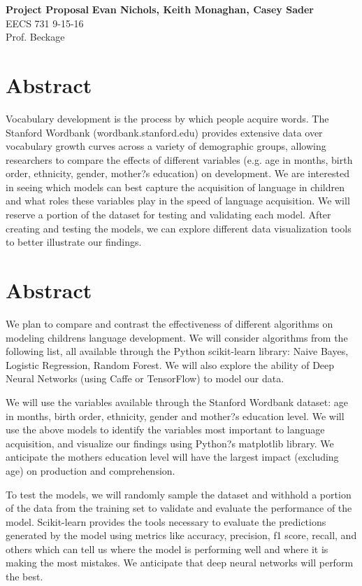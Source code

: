 \documentclass[11pt]{article}
\begin{document}
\noindent
\large\textbf{Project Proposal} \hfill \textbf{Evan Nichols, Keith Monaghan, Casey Sader} \\
\normalsize EECS 731 \hfill 9-15-16 \\ 
Prof. Beckage \hfill \\

\section{Abstract}

Vocabulary development is the process by which people acquire words. The Stanford Wordbank (wordbank.stanford.edu) provides extensive data over vocabulary growth curves across a variety of demographic groups, allowing researchers to compare the effects of different variables (e.g. age in months, birth order, ethnicity, gender, mother?s education) on development.  We are interested in seeing which models can best capture the acquisition of language in children and what roles these variables play in the speed of language acquisition. We will reserve a portion of the dataset for testing and validating each model. After creating and testing the models, we can explore different data visualization tools to better illustrate our findings.

\section{Abstract}

We plan to compare and contrast the effectiveness of different algorithms on modeling children\textquotesingle s language development. We will consider algorithms from the following list, all available through the Python scikit-learn library: Naive Bayes, Logistic Regression, Random Forest.  We will also explore the ability of Deep Neural Networks (using Caffe or TensorFlow) to model our data.  

We will use the variables available through the Stanford Wordbank dataset: age in months, birth order, ethnicity, gender and mother?s education level. We will use the above models to identify the variables most important to language acquisition, and visualize our findings using Python?s matplotlib library.  We anticipate the mother\textquotesingle s education level will have the largest impact (excluding age) on production and comprehension.    

To test the models, we will randomly sample the dataset and withhold a portion of the data from the training set to validate and evaluate the performance of the model.  Scikit-learn provides the tools necessary to evaluate the predictions generated by the model using metrics like accuracy, precision, f1 score, recall, and others which can tell us where the model is performing well and where it is making the most mistakes.  We anticipate that deep neural networks will perform the best.  
\end{document}
